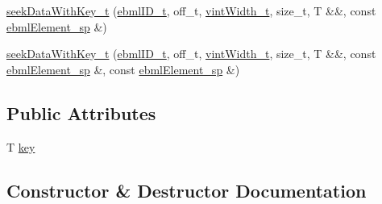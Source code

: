 \begin{DoxyCompactItemize}
\item 
\mbox{\hyperlink{classebml_1_1seekDataWithKey__t_a48a97c3a5b493a689a837e6f1d859469}{seek\+Data\+With\+Key\+\_\+t}} (\mbox{\hyperlink{namespaceebml_a86c5f604ddf12a74aa9812e997a58691}{ebml\+I\+D\+\_\+t}}, off\+\_\+t, \mbox{\hyperlink{namespaceebml_a2ccdfb60b23efb51fe07f9d066e23604}{vint\+Width\+\_\+t}}, size\+\_\+t, T \&\&, const \mbox{\hyperlink{namespaceebml_adad533b7705a16bb360fe56380c5e7be}{ebml\+Element\+\_\+sp}} \&)
\item 
\mbox{\hyperlink{classebml_1_1seekDataWithKey__t_a96571489016319c689963ab35f694e91}{seek\+Data\+With\+Key\+\_\+t}} (\mbox{\hyperlink{namespaceebml_a86c5f604ddf12a74aa9812e997a58691}{ebml\+I\+D\+\_\+t}}, off\+\_\+t, \mbox{\hyperlink{namespaceebml_a2ccdfb60b23efb51fe07f9d066e23604}{vint\+Width\+\_\+t}}, size\+\_\+t, T \&\&, const \mbox{\hyperlink{namespaceebml_adad533b7705a16bb360fe56380c5e7be}{ebml\+Element\+\_\+sp}} \&, const \mbox{\hyperlink{namespaceebml_adad533b7705a16bb360fe56380c5e7be}{ebml\+Element\+\_\+sp}} \&)
\end{DoxyCompactItemize}
\subsection*{Public Attributes}
\begin{DoxyCompactItemize}
\item 
T \mbox{\hyperlink{classebml_1_1seekDataWithKey__t_a5cc5af451ed608f03c4e68ef29651d9c}{key}}
\end{DoxyCompactItemize}


\subsection{Constructor \& Destructor Documentation}
\mbox{\label{classebml_1_1seekDataWithKey__t_a01ce559343d7fd9ab658f3b71d6ed448}} 
